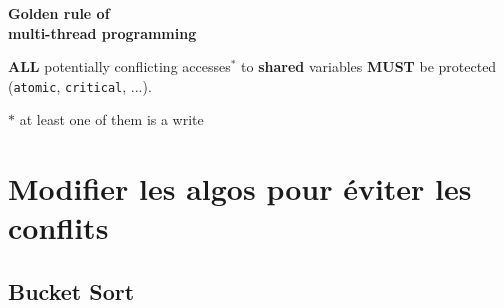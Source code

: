 \documentclass[xcolor={x11names,svgnames},x11names,svgnames]{beamer}
\begin{document}


\begin{frame}[label=golden_rule]
  \begin{center}
    \Huge \bf \alert{Golden rule of \\ multi-thread programming }
  \end{center}

  \bigskip
  
  {\Large \textbf{ALL} potentially conflicting accesses${}^*$
    to \textbf{shared} variables \alert{\textbf{MUST}} be protected (\texttt{atomic},
    \texttt{critical}, ...).}

  \bigskip

  $*$ at least one of them is a write
\end{frame}


\section{Modifier les algos pour éviter les conflits}


\subsection{Bucket Sort}

\end{document}
